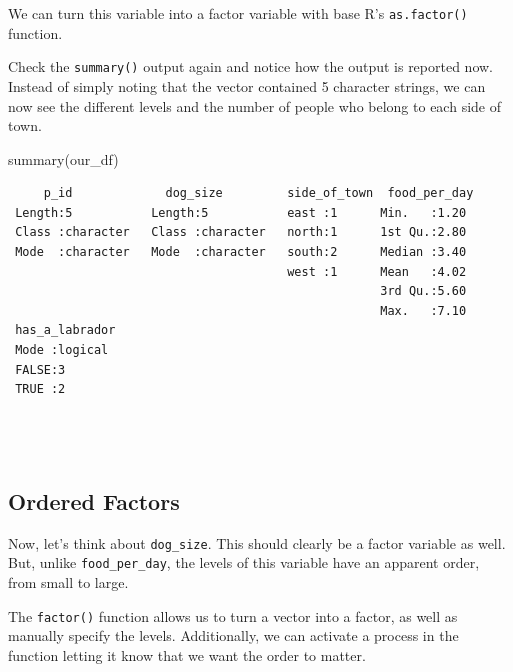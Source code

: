 \documentclass[
  letterpaper,
  DIV=11,
  numbers=noendperiod]{scrreprt}
\newenvironment{Shaded}{\begin{snugshade}}{\end{snugshade}}
\newcommand{\FunctionTok}[1]{\textcolor[rgb]{0.28,0.35,0.67}{#1}}
\newcommand{\NormalTok}[1]{\textcolor[rgb]{0.00,0.23,0.31}{#1}}
\newcommand{\OtherTok}[1]{\textcolor[rgb]{0.00,0.23,0.31}{#1}}
\newcommand{\SpecialCharTok}[1]{\textcolor[rgb]{0.37,0.37,0.37}{#1}}
\begin{document}
We can turn this variable into a factor variable with base R's
\texttt{as.factor()} function.

\begin{Shaded}
\end{Shaded}

Check the \texttt{summary()} output again and notice how the output is
reported now. Instead of simply noting that the vector contained 5
character strings, we can now see the different levels and the number of
people who belong to each side of town.

\begin{Shaded}
\begin{Highlighting}[]
\FunctionTok{summary}\NormalTok{(our\_df)}
\end{Highlighting}
\end{Shaded}

\begin{verbatim}
     p_id             dog_size         side_of_town  food_per_day 
 Length:5           Length:5           east :1      Min.   :1.20  
 Class :character   Class :character   north:1      1st Qu.:2.80  
 Mode  :character   Mode  :character   south:2      Median :3.40  
                                       west :1      Mean   :4.02  
                                                    3rd Qu.:5.60  
                                                    Max.   :7.10  
 has_a_labrador 
 Mode :logical  
 FALSE:3        
 TRUE :2        
                
                
                
\end{verbatim}

\subsection{Ordered Factors}\label{ordered-factors}

Now, let's think about \texttt{dog\_size}. This should clearly be a
factor variable as well. But, unlike \texttt{food\_per\_day}, the levels
of this variable have an apparent order, from small to large.

The \texttt{factor()} function allows us to turn a vector into a factor,
as well as manually specify the levels. Additionally, we can activate a
process in the function letting it know that we want the order to
matter.
\end{document}

